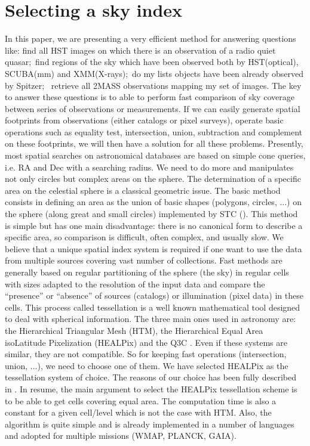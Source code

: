 \section{Selecting a sky index}
In this paper, we are presenting a very efficient method for answering questions like: find all HST images on which there is an observation of a radio quiet quasar;\ find regions of the sky which have been observed both by HST(optical), SCUBA(mm) and XMM(X-rays);\ do my lists objects have been already observed by Spitzer; \ retrieve all 2MASS observations mapping my set of images. 
The key to answer these questions is to able to perform fast comparison of sky coverage between series of observations or measurements. If we can easily generate spatial footprints from observations (either catalogs or pixel surveys), operate basic operations such as equality test, intersection, union, subtraction and complement on these footprints, we will then have a solution for all these problems. Presently, most spatial searches on astronomical databases are based on simple
cone queries, i.e. RA and Dec with a searching radius. We need to do more and manipulates not only circles but complex areas on the sphere.
The determination of a specific area on the celestial sphere is a classical geometric issue.
The basic method consists in defining an area as the union of basic shapes
(polygons, circles, ...) on the sphere (along great and small circles) implemented by STC (\cite{STC}). This method is simple but has one main disadvantage: there is no canonical form to describe a specific area, so comparison is difficult, often complex, and usually slow. We believe that a unique spatial index system is required if one want to use the data from multiple sources covering vast number of collections. Fast methods are generally based on regular partitioning of the sphere (the sky) in regular cells with sizes adapted to the resolution of the input data and compare the ``presence'' or ``absence'' of sources (catalogs) or illumination (pixel data) in these cells.
This process called tessellation is a well known mathematical tool designed to deal with spherical information.
The three main ones used in astronomy are: the Hierarchical Triangular Mesh \cite{HTM} (HTM),
the Hierarchical Equal Area isoLatitude Pixelization \cite{Healpix} (HEALPix) and the Q3C \cite{quadtreee}. Even if these systems are similar, they are not compatible. So for keeping fast operations (intersection, union, ...), we need to choose one of them. We have selected HEALPix as the tessellation system of choice. The reasons of our choice has been fully described in  \cite{Fernique}. In resume, the main argument to select the HEALPix tessellation scheme is to be able to get cells covering equal area. The computation time is also a constant for a given cell/level which is not the case with HTM. Also, the algorithm is quite simple and is already implemented in a number of languages and adopted for multiple missions  (WMAP, PLANCK, GAIA).


